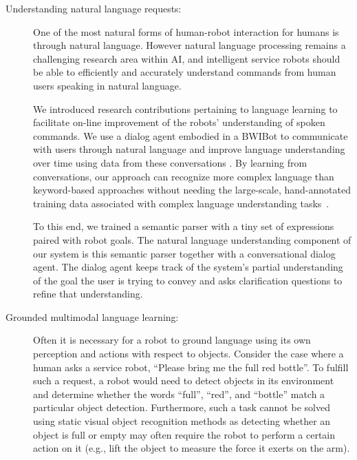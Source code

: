 \documentclass[runningheads,a4paper]{llncs}
\begin{document}
\begin{description}

\item [Understanding natural language requests:] 
One of the most natural forms of human-robot interaction for humans is through natural language.
However natural language processing remains a challenging research area within AI, and intelligent service robots should be able to efficiently and accurately understand commands from human users speaking in natural language.

We introduced research contributions pertaining to language learning
to facilitate on-line improvement of the robots' understanding of
spoken commands.  We use a dialog agent embodied in a BWIBot to
communicate with users through natural language and improve language
understanding over time using data from these conversations
\cite{thomason:15}.  By learning from conversations, our approach can
recognize more complex language than keyword-based approaches without
needing the large-scale, hand-annotated training data associated with
complex language understanding tasks~\cite{thomason:15}. 

To this end, we trained a semantic parser with a tiny set of
expressions paired with robot goals.  The natural language
understanding component of our system is this semantic parser together
with a conversational dialog agent.  The dialog agent keeps track of
the system's partial understanding of the goal the user is trying to
convey and asks clarification questions to refine that understanding.


\item[Grounded multimodal language learning:] Often it is necessary
for a robot to ground language using its own perception and actions
with respect to objects.  Consider the case where a human asks a
service robot, ``Please bring me the full red bottle''.  To fulfill
such a request, a robot would need to detect objects in its
environment and determine whether the words ``full'', ``red'', and
``bottle'' match a particular object detection.  Furthermore, such a
task cannot be solved using static visual object recognition methods
as detecting whether an object is full or empty may often require the
robot to perform a certain action on it (e.g., lift the object to
measure the force it exerts on the arm).


\end{description}
\end{document}
